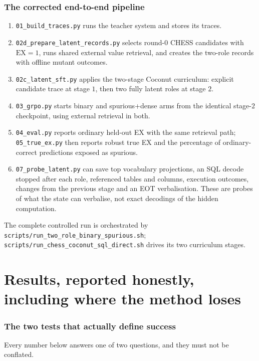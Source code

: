 \documentclass[11pt]{article}
\theoremstyle{definition}
\begin{document}
\section{The corrected end-to-end pipeline}

\begin{enumerate}
\item \texttt{01\_build\_traces.py} runs the teacher system and stores its traces.
\item \texttt{02d\_prepare\_latent\_records.py} selects round-$0$ CHESS candidates with $\mathrm{EX}=1$, runs shared external value retrieval, and creates the two-role records with offline mutant outcomes.
\item \texttt{02c\_latent\_sft.py} applies the two-stage Coconut curriculum: explicit candidate trace at stage $1$, then two fully latent roles at stage $2$.
\item \texttt{03\_grpo.py} starts binary and spurious+dense arms from the identical stage-$2$ checkpoint, using external retrieval in both.
\item \texttt{04\_eval.py} reports ordinary held-out EX with the same retrieval path; \texttt{05\_true\_ex.py} then reports robust true EX and the percentage of ordinary-correct predictions exposed as spurious.
\item \texttt{07\_probe\_latent.py} can save top vocabulary projections, an SQL decode stopped after each role, referenced tables and columns, execution outcomes, changes from the previous stage and an EOT verbalisation. These are probes of what the state can verbalise, not exact decodings of the hidden computation.
\end{enumerate}

The complete controlled run is orchestrated by \texttt{scripts/run\_two\_role\_binary\_spurious.sh}; \texttt{scripts/run\_chess\_coconut\_sql\_\allowbreak direct.sh} drives its two curriculum stages.

\newpage
\part{Results, reported honestly, including where the method loses}
\label{part:results}

\section{The two tests that actually define success}

Every number below answers one of two questions, and they must not be conflated.
\end{document}
